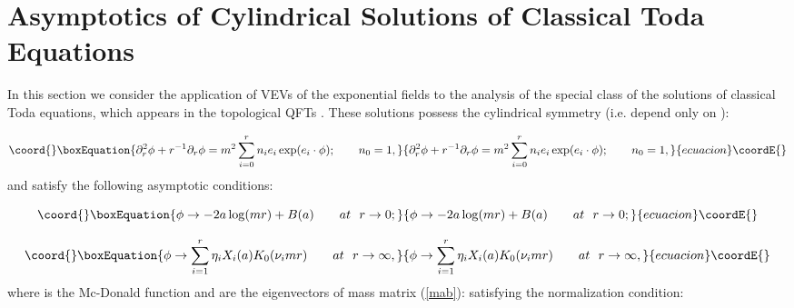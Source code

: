 \documentclass[a4paper,12pt]{article}
\begin{document}
\section{ Asymptotics of Cylindrical Solutions of Classical Toda Equations}

In this section we consider the application of VEVs \coordHE{} of the
exponential fields to the analysis of the special class of the solutions of
classical Toda equations, which appears in the topological QFTs \cite{CV}.
These solutions possess the cylindrical symmetry (i.e. depend only on 
\coordHE{}):

\begin{equation}\coord{}\boxEquation{
\partial _r^2\phi +r^{-1}\partial _r\phi =m^2\sum_{i=0}^rn_ie_i\exp
(e_i\cdot \phi );\qquad n_0=1,  \label{clt}
}{
\partial _r^2\phi +r^{-1}\partial _r\phi =m^2\sum_{i=0}^rn_ie_i\exp
(e_i\cdot \phi );\qquad n_0=1,  }{ecuacion}\coordE{}\end{equation}
and satisfy the following asymptotic conditions:

\begin{equation}\coord{}\boxEquation{
\phi \rightarrow -2a\log (mr)+B(a)\qquad at~\ r\rightarrow 0;  \label{sda}
}{
\phi \rightarrow -2a\log (mr)+B(a)\qquad at~\ r\rightarrow 0;  }{ecuacion}\coordE{}\end{equation}

\begin{equation}\coord{}\boxEquation{
\phi \rightarrow \sum_{i=1}^r\eta _iX_i(a)K_0(\nu _imr)\qquad at\ \
r\rightarrow \infty ,  \label{lda}
}{
\phi \rightarrow \sum_{i=1}^r\eta _iX_i(a)K_0(\nu _imr)\qquad at\ \
r\rightarrow \infty ,  }{ecuacion}\coordE{}\end{equation}
where \myHighlight{$K_0(t)$}\coordHE{} is the Mc-Donald function and \coordHE{} are the eigenvectors
of mass matrix (\ref{mab}): \coordHE{} satisfying the
normalization condition:
\end{document}
